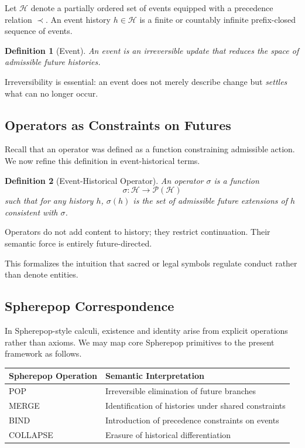 \documentclass[11pt]{article}
\newtheorem{definition}{Definition}
\newcommand{\Hist}{\mathcal{H}}
\begin{document}
Let $\Hist$ denote a partially ordered set of events equipped with a precedence
relation $\prec$. An event history $h \in \Hist$ is a finite or countably infinite
prefix-closed sequence of events.

\begin{definition}[Event]
An event is an irreversible update that reduces the space of admissible future
histories.
\end{definition}

Irreversibility is essential: an event does not merely describe change but
\emph{settles} what can no longer occur.

\subsection{Operators as Constraints on Futures}

Recall that an operator was defined as a function constraining admissible action.
We now refine this definition in event-historical terms.

\begin{definition}[Event-Historical Operator]
An operator $\sigma$ is a function
\[
\sigma : \Hist \to \mathcal{P}(\Hist)
\]
such that for any history $h$, $\sigma(h)$ is the set of admissible future
extensions of $h$ consistent with $\sigma$.
\end{definition}

Operators do not add content to history; they restrict continuation. Their
semantic force is entirely future-directed.

This formalizes the intuition that sacred or legal symbols regulate conduct rather
than denote entities.

\subsection{Spherepop Correspondence}

In Spherepop-style calculi, existence and identity arise from explicit operations
rather than axioms. We may map core Spherepop primitives to the present framework
as follows.

\begin{center}
\begin{tabular}{ll}
\textbf{Spherepop Operation} & \textbf{Semantic Interpretation} \\
\midrule
POP & Irreversible elimination of future branches \\
MERGE & Identification of histories under shared constraints \\
BIND & Introduction of precedence constraints on events \\
COLLAPSE & Erasure of historical differentiation \\
\end{tabular}
\end{center}
\end{document}

